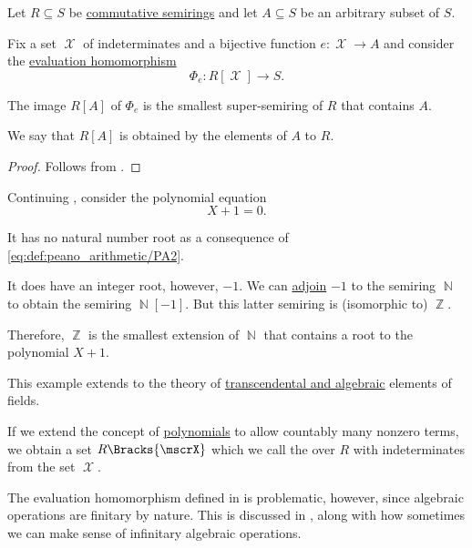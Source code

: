 \begin{proposition}\label{thm:adjoining_elements_to_semiring}
  Let \( R \subseteq S \) be \hyperref[def:semiring/commutative]{commutative semirings} and let \( A \subseteq S \) be an arbitrary subset of \( S \).

  Fix a set \( \mscrX \) of indeterminates and a bijective function \( e: \mscrX \to A \) and consider the \hyperref[thm:polynomial_semiring_universal_property]{evaluation homomorphism}
  \begin{equation*}
    \Phi_e: R[\mscrX] \to S.
  \end{equation*}

  The image \( R[A] \) of \( \Phi_e \) is the smallest super-semiring of \( R \) that contains \( A \).

  We say that \( R[A] \) is obtained by  the elements of \( A \) to \( R \).
\end{proposition}
\begin{proof}
  Follows from .
\end{proof}

\begin{example}\label{ex:adjoining_root}
  Continuing , consider the polynomial equation
  \begin{equation*}
    X + 1 = 0.
  \end{equation*}

  It has no natural number root as a consequence of \eqref{eq:def:peano_arithmetic/PA2}.

  It does have an integer root, however, \( -1 \). We can \hyperref[thm:adjoining_elements_to_semiring]{adjoin} \( -1 \) to the semiring \( \BbbN \) to obtain the semiring \( \BbbN[-1] \). But this latter semiring is (isomorphic to) \( \BbbZ \).

  Therefore, \( \BbbZ \) is the smallest extension of \( \BbbN \) that contains a root to the polynomial \( X + 1 \).

  This example extends to the theory of \hyperref[def:transcendetal_element]{transcendental and algebraic} elements of fields.
\end{example}

\begin{definition}\label{def:formal_power_series}\mimprovised
  If we extend the concept of \hyperref[def:polynomial_semiring]{polynomials} to allow countably many nonzero terms, we obtain a set \( R\Bracks{\mscrX} \) which we call the  over \( R \) with indeterminates from the set \( \mscrX \).

  The evaluation homomorphism defined in  is problematic, however, since algebraic operations are finitary by nature. This is discussed in , along with how sometimes we can make sense of infinitary algebraic operations.
\end{definition}
